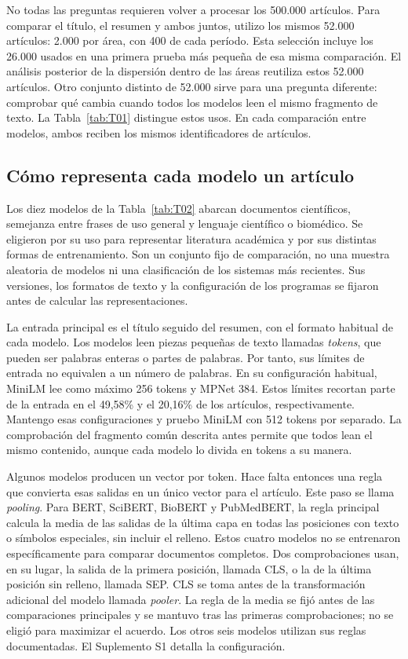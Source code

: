 No todas las preguntas requieren volver a procesar los 500.000 artículos. Para comparar el título, el resumen y ambos juntos, utilizo los mismos 52.000 artículos: 2.000 por área, con 400 de cada período. Esta selección incluye los 26.000 usados en una primera prueba más pequeña de esa misma comparación. El análisis posterior de la dispersión dentro de las áreas reutiliza estos 52.000 artículos. Otro conjunto distinto de 52.000 sirve para una pregunta diferente: comprobar qué cambia cuando todos los modelos leen el mismo fragmento de texto. La Tabla~\ref{tab:T01} distingue estos usos. En cada comparación entre modelos, ambos reciben los mismos identificadores de artículos.


\subsection{Cómo representa cada modelo un artículo}
Los diez modelos de la Tabla~\ref{tab:T02} abarcan documentos científicos, semejanza entre frases de uso general y lenguaje científico o biomédico. Se eligieron por su uso para representar literatura académica y por sus distintas formas de entrenamiento. Son un conjunto fijo de comparación, no una muestra aleatoria de modelos ni una clasificación de los sistemas más recientes. Sus versiones, los formatos de texto y la configuración de los programas se fijaron antes de calcular las representaciones.

La entrada principal es el título seguido del resumen, con el formato habitual de cada modelo. Los modelos leen piezas pequeñas de texto llamadas \emph{tokens}, que pueden ser palabras enteras o partes de palabras. Por tanto, sus límites de entrada no equivalen a un número de palabras. En su configuración habitual, MiniLM lee como máximo 256 tokens y MPNet 384. Estos límites recortan parte de la entrada en el 49,58\% y el 20,16\% de los artículos, respectivamente. Mantengo esas configuraciones y pruebo MiniLM con 512 tokens por separado. La comprobación del fragmento común descrita antes permite que todos lean el mismo contenido, aunque cada modelo lo divida en tokens a su manera.

Algunos modelos producen un vector por token. Hace falta entonces una regla que convierta esas salidas en un único vector para el artículo. Este paso se llama \emph{pooling}. Para BERT, SciBERT, BioBERT y PubMedBERT, la regla principal calcula la media de las salidas de la última capa en todas las posiciones con texto o símbolos especiales, sin incluir el relleno. Estos cuatro modelos no se entrenaron específicamente para comparar documentos completos. Dos comprobaciones usan, en su lugar, la salida de la primera posición, llamada CLS, o la de la última posición sin relleno, llamada SEP. CLS se toma antes de la transformación adicional del modelo llamada \emph{pooler}. La regla de la media se fijó antes de las comparaciones principales y se mantuvo tras las primeras comprobaciones; no se eligió para maximizar el acuerdo. Los otros seis modelos utilizan sus reglas documentadas. El Suplemento S1 detalla la configuración.


